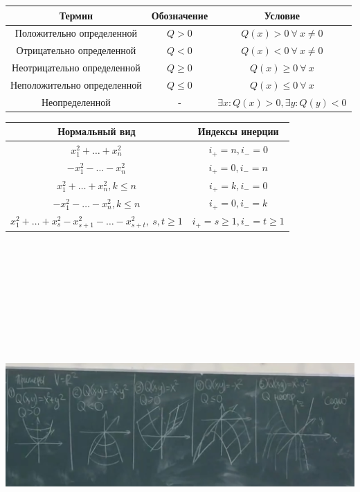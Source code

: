\vspace{\baselineskip}
\begin{center}
		\begin{tabular}{c|c|c}
    	Термин & Обозначение & Условие   \\
        \hline
        Положительно определенной & $Q > 0$ & $Q(x) > 0 \ \forall \ x \neq 0$ \\
        Отрицательно определенной & $Q < 0$ & $Q(x) < 0 \ \forall \ x \neq 0$ \\
        Неотрицательно определенной & $Q \geq 0$ & $Q(x) \geq 0 \ \forall \ x$ \\
        Неположительно определенной & $Q \leq 0$ & $Q(x) \leq 0 \ \forall \ x$ \\
        Неопределенной & - & $\exists x: Q(x) > 0, \exists y: Q(y) < 0$ 
        
		\end{tabular}
\end{center}
\begin{center}
		\begin{tabular}{c|c}
    	Нормальный вид & Индексы инерции   \\
        \hline
        $x_1^2 + \dots + x_n^2$ & $i_+ = n, i_- = 0$ \\
        $-x_1^2 - \dots - x_n^2$ & $i_+ = 0, i_- = n$ \\
        $x_1^2 + \dots + x_n^2, k \leq n$ & $i_+ = k, i_- = 0$ \\
        $-x_1^2 - \dots - x_n^2, k \leq n$ & $i_+ = 0, i_- = k$ \\
        $x_1^2 + \dots + x_s^2 - x_{s+1}^2 - \dots - x_{s+t}^2, \ s, t \geq 1$ & $i_+ = s \geq 1, i_- = t \geq 1$ 
		\end{tabular}
\end{center}

\vspace{\baselineskip}
\includegraphics[width=18cm,height=14cm,keepaspectratio]{examples.jpg}

